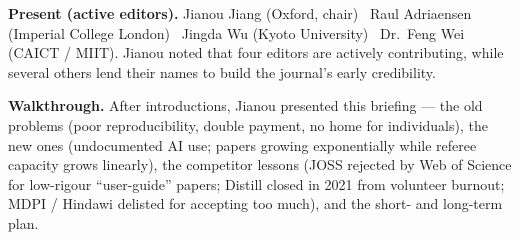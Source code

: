 \documentclass[11pt]{article}
\begin{document}
\vspace{4pt}
{\small
\textbf{Present (active editors).} Jianou Jiang (Oxford, chair) \textbullet\ Raul Adriaensen (Imperial College London) \textbullet\ Jingda Wu (Kyoto University) \textbullet\ Dr.\ Feng Wei (CAICT / MIIT). Jianou noted that four editors are actively contributing, while several others lend their names to build the journal's early credibility.

\textbf{Walkthrough.} After introductions, Jianou presented this briefing --- the old problems (poor reproducibility, double payment, no home for individuals), the new ones (undocumented AI use; papers growing exponentially while referee capacity grows linearly), the competitor lessons (JOSS rejected by Web of Science for low-rigour ``user-guide'' papers; Distill closed in 2021 from volunteer burnout; MDPI / Hindawi delisted for accepting too much), and the short- and long-term plan.

}
\end{document}
